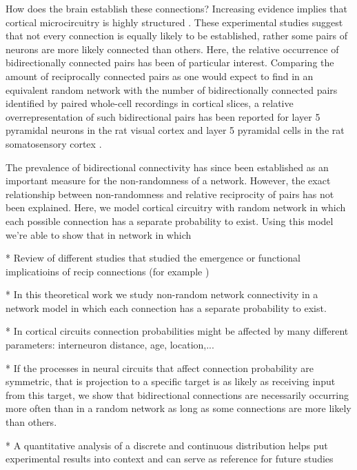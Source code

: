 

How does the brain establish these connections? Increasing evidence implies that cortical microcircuitry is highly structured \cite{Song2005,Perin2011}. These experimental studies suggest that not every connection is equally likely to be established, rather some pairs of neurons are more likely connected than others. Here, the relative occurrence of bidirectionally connected pairs has been of particular interest. Comparing the amount of reciprocally connected pairs as one would expect to find in an equivalent random network with the number of bidirectionally connected pairs identified by paired whole-cell recordings in cortical slices, a relative overrepresentation of such bidirectional pairs has been reported for layer 5 pyramidal neurons in the rat visual cortex \cite{Song2005} and layer 5 pyramidal cells in the rat somatosensory cortex \cite{Markram1997,Perin2011}.

The prevalence of bidirectional connectivity has since been established as an important measure for the non-randomness of a network. However, the exact relationship between non-randomness and relative reciprocity of pairs has not been explained. Here, we model cortical circuitry with random network in which each possible connection has a separate probability to exist. Using this model we're able to show that in network in which 


* Review of different studies that studied the emergence or functional implicatioins of recip connections (for example \cite{Clopath2010})

* In this theoretical work we study non-random network connectivity in a network model in which each connection has a separate probability to exist.

* In cortical circuits connection probabilities might be affected by many different parameters: interneuron distance, age, location,...

* If the processes in neural circuits that affect connection probability are symmetric, that is projection to a specific target is as likely as receiving input from this target, we show that bidirectional connections are necessarily occurring more often than in a random network as long as some connections are more likely than others.



* A quantitative analysis of a discrete and continuous distribution helps put experimental results into context and can serve as reference for future studies




